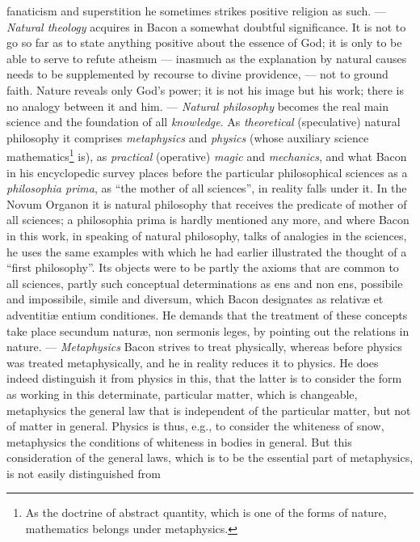 fanaticism and superstition he sometimes strikes positive
religion as such. --- \emph{Natural theology} acquires in
Bacon a somewhat doubtful significance. It is not to go so far as to
state anything positive about the essence of God; it is only to be able to serve
to refute atheism --- inasmuch as the explanation by natural
causes needs to be supplemented by recourse to divine providence, --- not to ground faith. Nature reveals only God's power; it is not his image but his
work; there is no analogy between it and him. --- \emph{Natural \setcounter{footnote}{0}philosophy} becomes the real main science and the foundation of all
\emph{knowledge}. As \emph{theoretical} (speculative) natural philosophy it comprises \emph{metaphysics} and \emph{physics}
(whose auxiliary science mathematics\footnote{As the doctrine of abstract quantity, which is one of the forms of nature,
mathematics belongs under metaphysics.} is), as \emph{practical}
(operative) \emph{magic} and \emph{mechanics}, and what Bacon in his
encyclopedic survey places before the particular philosophical
sciences as a \emph{philosophia prima}, as ``the mother of all sciences'', in reality falls under it. In the Novum
Organon it is natural philosophy that receives the predicate of mother of all
sciences; a philosophia
prima is hardly mentioned any more, and where Bacon in this work, in speaking of natural philosophy, talks of analogies in the sciences, he uses
the same examples with which he had earlier illustrated the thought of
a ``first philosophy''. Its objects were to be partly
the axioms that are common to all sciences, partly such conceptual determinations as ens and non ens, possibile and
impossibile, simile and diversum, which Bacon designates as
relativæ et adventitiæ entium conditiones. He demands that
the treatment of these concepts take place secundum naturæ,
non sermonis leges, by pointing out the relations in nature. ---
\emph{Metaphysics} Bacon strives to treat physically, whereas before physics was treated metaphysically, and he in reality reduces it to physics. He does indeed distinguish it
from physics in this, that the latter is to consider the form as working in this determinate, particular matter, which is changeable,
metaphysics the general law that is independent of the
particular matter, but not of matter in general. Physics
is thus, e.g., to consider the whiteness of snow, metaphysics
the conditions of whiteness in bodies in general. But
this consideration of the general laws, which is to be
the essential part of metaphysics, is not easily distinguished from
